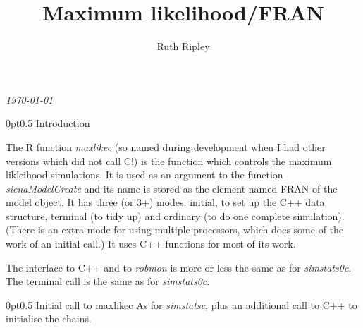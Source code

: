 \documentclass[12pt,a4paper]{article}
\makeatletter
\renewcommand{\=}{\,=\,}
\newcommand{\+}{\,+\,}
\newcommand{\nm}[1]{\textsf{\small #1}}
\newcommand{\nnm}[1]{\textsf{\small\textit{#1}}}
\newcommand{\R}{{\sf R }}
\renewcommand{\section}{\@startsection{section}{1}
                {0pt}{\baselineskip}{0.5\baselineskip}
                {\centering\sffamily} }
\makeatother
\begin{document}
\title{Maximum likelihood/FRAN}
\author{Ruth Ripley}
\date{}
\maketitle

\centerline{\emph{\today}}
\bigskip
\section{Introduction}

The \R function \nnm{maxlikec} (so named during development when I had other
versions which did not call C!) is the function which controls the maximum
likleihood simulations.  It is used as an argument to the function
\nnm{sienaModelCreate} and its name is stored as the element named \nm{FRAN} of
the model object.  It has three (or 3+) modes: initial, to set up the C++ data
structure, terminal (to tidy up) and ordinary (to do one complete
simulation). (There is an extra mode for using multiple processors, which does
some of the work of an initial call.) It uses C++ functions for most of its
work.

The interface to C++ and to \nnm{robmon} is more or less the same as for
\nnm{simstats0c}. The terminal call is the same as for \nnm{simstats0c}.


\section{Initial call to maxlikec}
As for \nnm{simstatsc}, plus an additional call to C++ to initialise the
chains.
\end{document}
